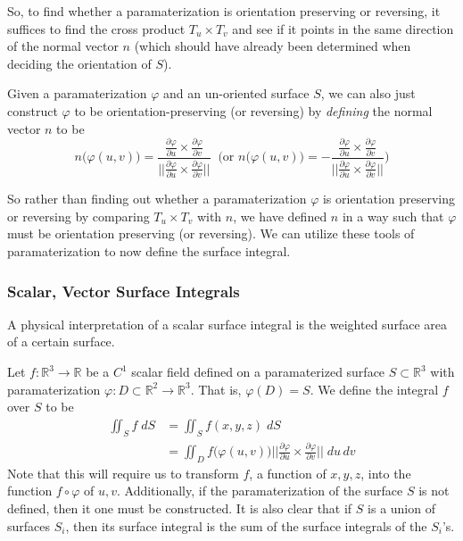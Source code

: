   So, to find whether a paramaterization is orientation preserving or reversing, it suffices to find the cross product $T_u \times T_v$ and see if it points in the same direction of the normal vector $n$ (which should have already been determined when deciding the orientation of $S$). 

  Given a paramaterization $\varphi$ and an un-oriented surface $S$, we can also just construct $\varphi$ to be orientation-preserving (or reversing) by \textit{defining} the normal vector $n$ to be 
	\begin{equation}
  	n\big( \varphi(u, v)\big) = \frac{\frac{\partial \varphi}{\partial u} \times \frac{\partial \varphi}{\partial v}}{\big|\big|\frac{\partial \varphi}{\partial u} \times \frac{\partial \varphi}{\partial v}\big|\big|} \;\; \bigg( \text{or } n\big( \varphi(u, v)\big) = - \frac{\frac{\partial \varphi}{\partial u} \times \frac{\partial \varphi}{\partial v}}{\big|\big|\frac{\partial \varphi}{\partial u} \times \frac{\partial \varphi}{\partial v}\big|\big|} \bigg)
	\end{equation}

  So rather than finding out whether a paramaterization $\varphi$ is orientation preserving or reversing by comparing $T_u \times T_v$ with $n$, we have defined $n$ in a way such that $\varphi$ must be orientation preserving (or reversing). We can utilize these tools of paramaterization to now define the surface integral. 

\subsubsection{Scalar, Vector Surface Integrals}

  A physical interpretation of a scalar surface integral is the weighted surface area of a certain surface. 

  \begin{definition}
		Let $f: \mathbb{R}^3 \longrightarrow \mathbb{R}$ be a $C^1$ scalar field defined on a paramaterized surface $S \subset \mathbb{R}^3$ with paramaterization $\varphi: D \subset \mathbb{R}^2 \longrightarrow \mathbb{R}^3$. That is, $\varphi(D) = S$. We define the integral $f$ over $S$ to be
		\begin{align}
			\iint_S f \; dS & = \iint_S f(x, y, z) \; dS \\
			& = \iint_D f\big( \varphi(u, v)\big) \bigg|\bigg|\frac{\partial \varphi}{\partial u} \times \frac{\partial \varphi}{\partial v}\bigg|\bigg| \; du \,dv
		\end{align}
		Note that this will require us to transform $f$, a function of $x, y, z$, into the function $f \circ \varphi$ of $u, v$. Additionally, if the paramaterization of the surface $S$ is not defined, then it one must be constructed. It is also clear that if $S$ is a union of surfaces $S_i$, then its surface integral is the sum of the surface integrals of the $S_i$'s. 
  \end{definition}

